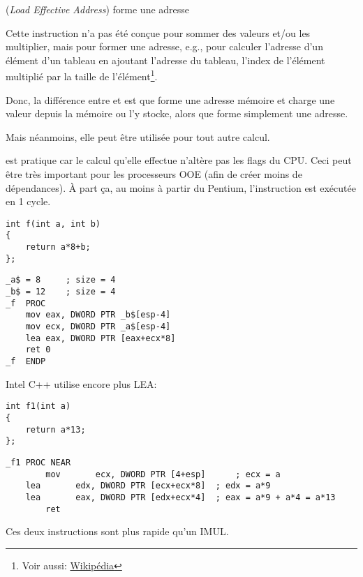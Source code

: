 \item[LEA] (\emph{Load Effective Address}) forme une adresse

\label{sec:LEA}

\newcommand{\URLAM}{\href{http://en.wikipedia.org/wiki/Addressing_mode}{Wikipédia}}

Cette instruction n'a pas été conçue pour sommer des valeurs et/ou les multiplier,
mais pour former une adresse, e.g., pour calculer l'adresse d'un élément d'un tableau
en ajoutant l'adresse du tableau, l'index de l'élément multiplié par la taille de
l'élément\footnote{Voir aussi: \URLAM}.
\par
Donc, la différence entre \MOV et \LEA est que \MOV forme une adresse mémoire et
charge une valeur depuis la mémoire ou l'y stocke, alors que \LEA forme simplement une adresse.
\par
Mais néanmoins, elle peut être utilisée pour tout autre calcul.
\par
\LEA est pratique car le calcul qu'elle effectue n'altère pas les flags du \ac{CPU}.
Ceci peut être très important pour les processeurs \ac{OOE} (afin de créer moins de dépendances).
À part ça, au moins à partir du Pentium, l'instruction \LEA est exécutée en 1 cycle.

\begin{lstlisting}[style=customc]
int f(int a, int b)
{
	return a*8+b;
};
\end{lstlisting}

\begin{lstlisting}[caption=MSVC 2010 \Optimizing,style=customasmx86]
_a$ = 8		; size = 4
_b$ = 12	; size = 4
_f	PROC
	mov	eax, DWORD PTR _b$[esp-4]
	mov	ecx, DWORD PTR _a$[esp-4]
	lea	eax, DWORD PTR [eax+ecx*8]
	ret	0
_f	ENDP
\end{lstlisting}

Intel C++ utilise encore plus LEA:

\begin{lstlisting}[style=customc]
int f1(int a)
{
	return a*13;
};
\end{lstlisting}

\begin{lstlisting}[caption=Intel C++ 2011,style=customasmx86]
_f1	PROC NEAR
        mov       ecx, DWORD PTR [4+esp]      ; ecx = a
	lea       edx, DWORD PTR [ecx+ecx*8]  ; edx = a*9
	lea       eax, DWORD PTR [edx+ecx*4]  ; eax = a*9 + a*4 = a*13
        ret
\end{lstlisting}

Ces deux instructions sont plus rapide qu'un IMUL.

